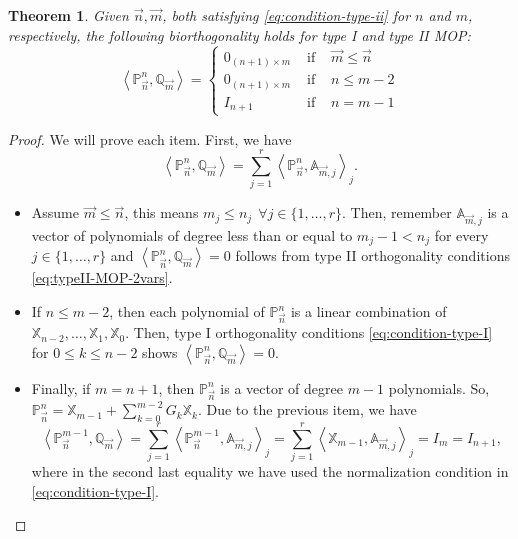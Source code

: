 \documentclass[12pt,a4]{report}
\theoremstyle{plain}
\newtheorem{theorem}{Theorem}[section]
\newcommand{\prodesc}[2]{\left\langle #1 , #2 \right\rangle}
\begin{document}
\begin{theorem}
    \label{th:biorthogonality}
    Given $\vec n, \vec m$, both satisfying \eqref{eq:condition-type-ii} for $n$ and $m$, respectively, the following biorthogonality holds for type I and type II MOP:
    \begin{equation}
        \prodesc{\mathbb P_{\vec n}^n}{\mathbb Q_{\vec m}} = \left\{\begin{array}{ccl}
            0_{(n+1)\times m} &   \text{ if } & \vec m \leq \vec n \\
            0_{(n+1)\times m} &   \text{ if } &  n \leq m -2 \\
            I_{n+1} & \text{ if } & n=m-1 
        \end{array}\right.   
    \end{equation}
\end{theorem}
\begin{proof}
    We will prove each item. First, we have
    \begin{equation*}
        \prodesc{\mathbb P_{\vec n}^n}{\mathbb Q_{\vec m}} = \sum_{j=1}^r \prodesc{\mathbb{P}_{\vec n}^n}{\mathbb A_{\vec m, j}}_j.
    \end{equation*}
    \begin{itemize}
        \item Assume $\vec m \leq \vec n$, this means $m_j \leq n_j \ \ \forall j\in\{1,\dots,r\}$. Then, remember $\mathbb{A}_{\vec m,j}$ is a vector of polynomials of degree less than or equal to $m_j-1 < n_j$ for every $j\in\{1,\dots,r\}$ and $\prodesc{\mathbb P_{\vec n}^n}{\mathbb Q_{\vec m}} =0$ follows from type II orthogonality conditions \eqref{eq:typeII-MOP-2vars}.
        \item  If $n\leq m-2$, then each polynomial of $\mathbb P_{\vec n}^n$ is a linear combination of $\mathbb X_{n-2},\dots,\mathbb X_1,\mathbb X_0$. Then, type I orthogonality conditions \eqref{eq:condition-type-I} for $0\leq k\leq n-2$ shows $\prodesc{\mathbb P_{\vec n}^n}{\mathbb Q_{\vec m}} =0$.
        \item Finally, if $m=n+1$, then $\mathbb P_{\vec n}^n$ is a vector of degree $m-1$ polynomials. So, $\mathbb P_{\vec n}^n = \mathbb X_{m-1} + \displaystyle\sum_{k=0}^{m-2} G_{k} \mathbb X_{k}$. Due to the previous item, we have
        $$
        \prodesc{\mathbb P_{\vec n}^{m-1}}{\mathbb Q_{\vec m}} = \sum_{j=1}^r \prodesc{\mathbb{P}_{\vec n}^{m-1}}{\mathbb A_{\vec m, j}}_j = \sum_{j=1}^r \prodesc{\mathbb X_{m-1}}{\mathbb A_{\vec m, j}}_j = I_m = I_{n+1},
        $$
        where in the second last equality we have used the normalization condition in \eqref{eq:condition-type-I}.
    \end{itemize}
\end{proof}
\end{document}
